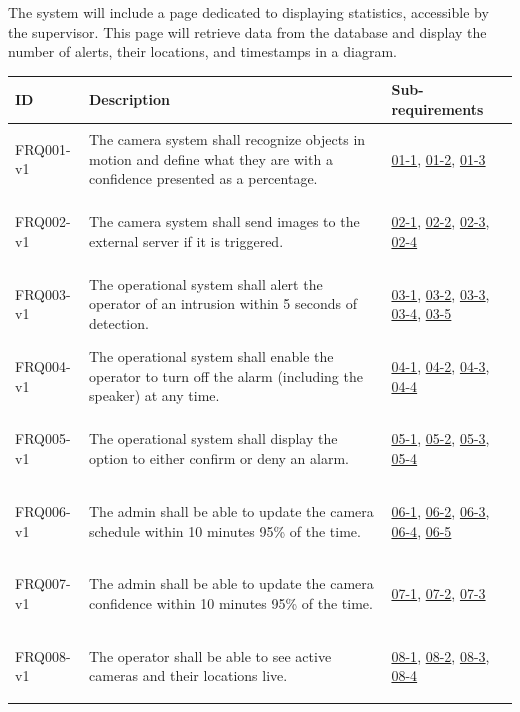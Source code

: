 \documentclass{article}
\begin{document}
The system will include a page dedicated to displaying statistics, accessible by the supervisor. This page will retrieve data from the database and display the number of alerts, their locations, and timestamps in a diagram. 
\clearpage
\begin{table}[h]
\centering
\begin{tabular}{|l|p{8cm}|p{5cm}|}
\hline
\textbf{ID} & \textbf{Description} & \textbf{Sub-requirements} \\
\hline
\hypertarget{FRQ001}{FRQ001-v1} & The camera system shall recognize objects in motion and define what they are with a confidence presented as a percentage. & 
\hyperlink{01-1}{01-1}, \hyperlink{01-2}{01-2}, \hyperlink{01-3}{01-3} \\
\hline
\hypertarget{FRQ002}{FRQ002-v1} & The camera system shall send images to the external server if it is triggered. & 
\hyperlink{02-1}{02-1}, \hyperlink{02-2}{02-2}, \hyperlink{02-3}{02-3}, \hyperlink{02-4}{02-4} \\
\hline
\hypertarget{FRQ003}{FRQ003-v1} & The operational system shall alert the operator of an intrusion within 5 seconds of detection. & 
\hyperlink{03-1}{03-1}, \hyperlink{03-2}{03-2}, \hyperlink{03-3}{03-3}, \hyperlink{03-4}{03-4}, \hyperlink{03-5}{03-5} \\
\hline
\hypertarget{FRQ004}{FRQ004-v1} & The operational system shall enable the operator to turn off the alarm (including the speaker) at any time. & 
\hyperlink{04-1}{04-1}, \hyperlink{04-2}{04-2}, \hyperlink{04-3}{04-3}, \hyperlink{04-4}{04-4} \\
\hline
\hypertarget{FRQ005}{FRQ005-v1} & The operational system shall display the option to either confirm or deny an alarm. & 
\hyperlink{05-1}{05-1}, \hyperlink{05-2}{05-2}, \hyperlink{05-3}{05-3}, \hyperlink{05-4}{05-4} \\
\hline
\hypertarget{FRQ006}{FRQ006-v1} & The admin shall be able to update the camera schedule within 10 minutes 95\% of the time. & 
\hyperlink{06-1}{06-1}, \hyperlink{06-2}{06-2}, \hyperlink{06-3}{06-3}, \hyperlink{06-4}{06-4}, \hyperlink{06-5}{06-5} \\
\hline
\hypertarget{FRQ007}{FRQ007-v1} & The admin shall be able to update the camera confidence within 10 minutes 95\% of the time. & 
\hyperlink{07-1}{07-1}, \hyperlink{07-2}{07-2}, \hyperlink{07-3}{07-3} \\
\hline
\hypertarget{FRQ008}{FRQ008-v1} & The operator shall be able to see active cameras and their locations live. & 
\hyperlink{08-1}{08-1}, \hyperlink{08-2}{08-2}, \hyperlink{08-3}{08-3}, \hyperlink{08-4}{08-4} \\

\end{tabular}
\end{table}
\end{document}
